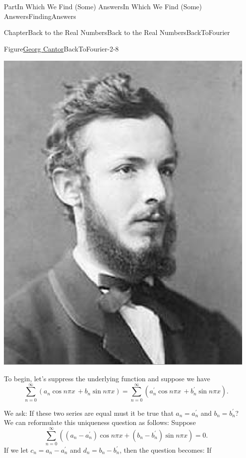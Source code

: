\documentclass[oneside,10pt,]{book}
\numberwithin{equation}{part}
\begin{document}
\begin{partptx}{Part}{In Which We Find (Some) Answers}{}{In Which We Find (Some) Answers}{}{}{FindingAnswers}
\begin{chapterptx}{Chapter}{Back to the Real Numbers}{}{Back to the Real Numbers}{}{}{BackToFourier}
\begin{introduction}{}
\begin{figureptx}{Figure}{\href{https://mathshistory.st-andrews.ac.uk/Biographies/Cantor/}{Georg Cantor}}{BackToFourier-2-8}{}
\begin{image}{0.325}{0.35}{0.325}{}
\includegraphics[width=\linewidth]{external/images/Cantor.png}
\end{image}%
\tcblower
\end{figureptx}%
To begin, let's suppress the underlying function and suppose we have%
\begin{equation*}
\sum_{n=0}^\infty(a_n\cos n\pi x\,+b_n\sin n\pi x) =
\sum_{n=0}^\infty(a^\prime_n\cos n\pi x\,+b^\prime_n\sin n\pi
x) \text{.}
\end{equation*}
%
\par
We ask: If these two series are equal must it be true that \(a_n=a^\prime_n\) and \(b_n=b^\prime_n\)?  We can reformulate this uniqueness question as follows: Suppose%
\begin{equation*}
\displaystyle\sum_{n=0}^\infty\left((a_n-a^\prime_n)\cos n\pi
x +(b_n-b^\prime_n)\sin n\pi x\right) = 0 \text{.}
\end{equation*}
If we let \(c_n = a_n-a^\prime_n\) and \(d_n =
b_n-b^\prime_n\), then the question becomes: If%
\begin{equation*}

\end{equation*}
\end{introduction}
\end{chapterptx}
\end{partptx}
\end{document}
